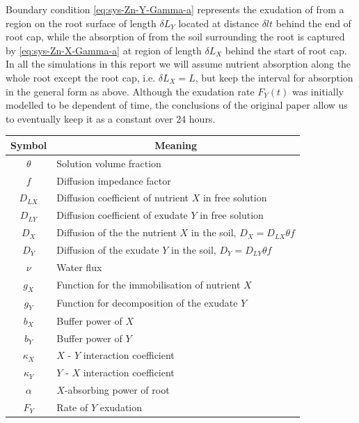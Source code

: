 \documentclass[11pt]{article}
\numberwithin{equation}{section}
\begin{document}
Boundary condition \eqref{eq:sys-Zn-Y-Gamma-a}  represents the exudation of  from a region on the root surface of length $\delta L_Y$ located at distance $\delta lt$ behind the end of root cap, while the absorption of  from the soil surrounding the root is captured by \eqref{eq:sys-Zn-X-Gamma-a} at region of length $\delta L_X$ behind the start of root cap. In all the simulations in this report we will assume nutrient absorption along the whole root except the root cap, i.e. $\delta L_X = L$, but keep the interval for absorption in the general form as above. Although the exudation rate $F_Y(t)$ was initially modelled to be dependent of time, the conclusions of the original paper allow us to eventually keep it as a constant over 24 hours.



\begin{table}[!htb]
\begin{center}
\fontsize{9.5}{7}\selectfont
\setlength{\tabcolsep}{5.pt}
\def\arraystretch{1.5}
\begin{tabular}{cl}
\toprule
    \bf Symbol & \multicolumn{1}{c}{\bf Meaning}
    \\ \midrule
    $\theta$ & Solution volume fraction \\
    $f$ & Diffusion impedance factor \\
    $D_{LX}$ & Diffusion coefficient of nutrient $X$  in free solution \\
    $D_{LY}$ & Diffusion coefficient of exudate $Y$  in free solution \\
    $D_X$ & Diffusion of the the nutrient $X$ in the soil, $D_X = D_{LX} \theta f$  \\  
	$D_{Y}$ &  Diffusion of the exudate $Y$ in the soil, $D_{Y} = D_{LY} \theta f$  \\ 
	$\nu$ & Water flux\\
	$g_X$ & Function for the immobilisation of nutrient $X$ \\
	$g_{Y}$ & Function for decomposition of the exudate $Y$ \\
	$b_X$ & Buffer power of $X$ \\
	$b_{Y}$ & Buffer power of $Y$ \\
	$\kappa_{X}$ & $X$ - $Y$ interaction coefficient \\
	$\kappa_{Y}$ & $Y$ - $X$ interaction coefficient\\
	$\alpha $ & $X$-absorbing power of root \\
	$F_{Y} $ & Rate of $Y$ exudation  \\

\end{tabular}
\end{center}
\end{table}
\end{document}
